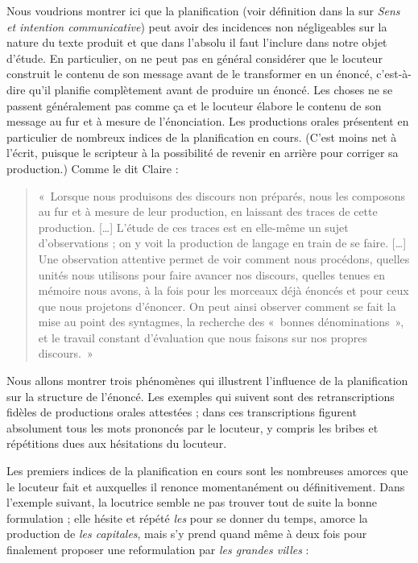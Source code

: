 Nous voudrions montrer ici que la planification (voir définition dans la  sur \textit{Sens et intention communicative}) peut avoir des incidences non négligeables sur la nature du texte produit et que dans l’absolu il faut l’inclure dans notre objet d’étude. En particulier, on ne peut pas en général considérer que le locuteur construit le contenu de son message avant de le transformer en un énoncé, c’est-à-dire qu’il planifie complètement avant de produire un énoncé. Les choses ne se passent généralement pas comme ça et le locuteur élabore le contenu de son message au fur et à mesure de l’énonciation. Les productions orales présentent en particulier de nombreux indices de la planification en cours. (C’est moins net à l’écrit, puisque le scripteur à la possibilité de revenir en arrière pour corriger sa production.) Comme le dit Claire \citet[17]{blanche-benveniste1990francais}:
\begin{quote}
«~Lorsque nous produisons des discours non préparés, nous les composons au fur et à mesure de leur production, en laissant des traces de cette production. […] L’étude de ces traces est en elle-même un sujet d’observations ; on y voit la production de langage en train de se faire. […] Une observation attentive permet de voir comment nous procédons, quelles unités nous utilisons pour faire avancer nos discours, quelles tenues en mémoire nous avons, à la fois pour les morceaux déjà énoncés et pour ceux que nous projetons d’énoncer. On peut ainsi observer comment se fait la mise au point des syntagmes, la recherche des «~bonnes dénominations~», et le travail constant d’évaluation que nous faisons sur nos propres discours.~»\end{quote}

Nous allons montrer trois phénomènes qui illustrent l’influence de la planification sur la structure de l’énoncé. Les exemples qui suivent sont des retranscriptions fidèles de productions orales attestées ; dans ces transcriptions figurent absolument tous les mots prononcés par le locuteur, y compris les bribes et répétitions dues aux hésitations du locuteur.

Les premiers indices de la planification en cours sont les nombreuses amorces que le locuteur fait et auxquelles il renonce momentanément ou définitivement. Dans l’exemple suivant, la locutrice semble ne pas trouver tout de suite la bonne formulation ; elle hésite et répété \textit{les} pour se donner du temps, amorce la production de \textit{les capitales}, mais s’y prend quand même à deux fois pour finalement proposer une reformulation par \textit{les grandes villes} :

